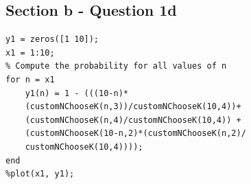 \documentclass[14.5pt]{article}
\begin{document}
\subsection*{Section b - Question 1d}
\begin{lstlisting}
y1 = zeros([1 10]);
x1 = 1:10;
% Compute the probability for all values of n
for n = x1
    y1(n) = 1 - (((10-n)*
    (customNChooseK(n,3))/customNChooseK(10,4))+
    (customNChooseK(n,4)/customNChooseK(10,4)) + 
    (customNChooseK(10-n,2)*(customNChooseK(n,2)/
    customNChooseK(10,4))));
end
%plot(x1, y1);

     
\end{lstlisting}
\end{document}
